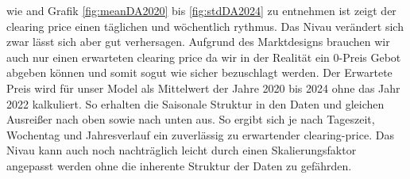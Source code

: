 wie and Grafik \ref{fig:meanDA2020} bis \ref{fig:stdDA2024}      zu entnehmen ist zeigt der clearing price einen täglichen und wöchentlich  rythmus.
Das Nivau verändert sich zwar lässt sich aber gut verhersagen. Aufgrund des Marktdesigns brauchen wir auch nur einen erwarteten clearing price
da wir in der Realität ein 0-Preis Gebot abgeben können und somit sogut wie sicher bezuschlagt werden.
Der Erwartete Preis wird für unser Model als Mittelwert der Jahre 2020 bis 2024 ohne das Jahr 2022 kalkuliert. So erhalten die
Saisonale Struktur in den Daten und gleichen Ausreißer nach oben sowie nach unten aus. So ergibt sich je nach Tageszeit, Wochentag und Jahresverlauf ein zuverlässig
zu erwartender clearing-price. Das Nivau kann auch noch nachträglich leicht durch einen Skalierungsfaktor angepasst werden ohne die inherente Struktur der Daten zu gefährden.

